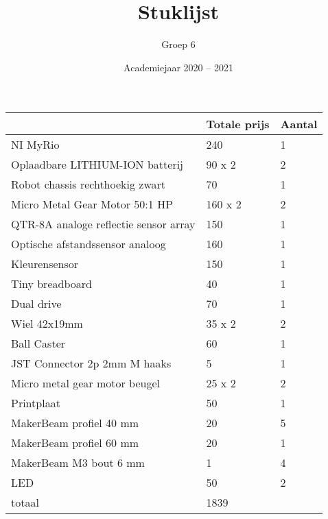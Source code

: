 \documentclass[a4paper,kulak]{kulakarticle} %
\date{Academiejaar 2020 -- 2021}
\title{Stuklijst}
\author{Groep 6}
\begin{document}
\maketitle

\begin{center}
	\begin{tabular}{|l|l|l|}
		\hline
		 & Totale prijs & Aantal \\ \hline
		 NI MyRio & 240 & 1 \\ \hline
		 Oplaadbare LITHIUM-ION batterij & 90 x 2 & 2 \\ \hline
		 Robot chassis rechthoekig zwart & 70 & 1 \\ \hline
		 Micro Metal Gear Motor 50:1 HP & 160 x 2 & 2 \\ \hline
		 QTR-8A analoge reflectie sensor array & 150 & 1 \\ \hline
		 Optische afstandssensor analoog & 160 & 1 \\ \hline 
		 Kleurensensor & 150 & 1 \\ \hline
		 Tiny breadboard & 40 & 1 \\ \hline
		 Dual drive & 70 & 1 \\ \hline 
		 Wiel 42x19mm & 35 x 2 & 2 \\ \hline
		 Ball Caster & 60 & 1 \\ \hline
		 JST Connector 2p 2mm M haaks & 5 & 1 \\ \hline
		 Micro metal gear motor beugel
& 25 x 2 & 2 \\ \hline
		 Printplaat & 50 & 1 \\ \hline
		 MakerBeam profiel 40 mm & 20 & 5 \\ \hline
		 MakerBeam profiel 60 mm & 20 & 1 \\ \hline
		 MakerBeam M3 bout 6 mm & 1 & 4 \\ \hline
		 LED & 50 & 2 \\ \hline
		 totaal & 1839 & \texttt{} \\ \hline
		    
		
		
	\end{tabular}
\end{center}
\end{document}
